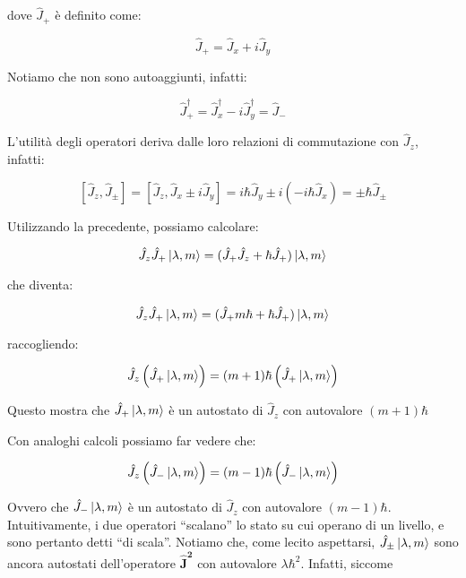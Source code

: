 dove $\hat{J}_+$ \`e definito come:

	\[
		\hat{J}_+ = \hat{J}_x + i \hat{J}_y
	\]

Notiamo che non sono autoaggiunti, infatti:

	\[
		\hat{J}^\dagger_+ = \hat{J}^\dagger_x - i \hat{J}^\dagger_y = \hat{J}_-
	\]

L'utilit\`a degli operatori deriva dalle loro relazioni di commutazione con $\hat{J}_z$, infatti:

	\begin{equation}
		\left [ \hat{J}_z, \hat{J}_\pm \right ] = \left [ \hat{J}_z, \hat{J}_x \pm i \hat{J}_y \right ] = i \hbar \hat{J}_y \pm
			i ( -i \hbar \hat{J}_x ) = \pm \hbar \hat{J}_\pm
	\end{equation}

Utilizzando la precedente, possiamo calcolare:

	\begin{equation}
		\hat{J}_z \hat{J}_+ \ket{ \lambda, m} = ( \hat{J}_+ \hat{J}_z + \hbar \hat{J}_+ ) \ket{\lambda, m}
	\end{equation}

che diventa:

	\begin{equation}
		\hat{J}_z \hat{J}_+ \ket{\lambda, m} = (\hat{J}_+ m \hbar + \hbar \hat{J}_+ ) \ket{\lambda, m}
	\end{equation}

raccogliendo:

	\begin{equation}
		\hat{J}_z \left ( \hat{J}_+ \ket{\lambda, m} \right ) = (m + 1) \hbar \left ( \hat{J}_+ \ket{\lambda, m} \right )
	\end{equation}

Questo mostra che $\hat{J}_+ \ket{\lambda, m}$ \`e un autostato di $\hat{J}_z$ con autovalore $(m+1) \hbar$

Con analoghi calcoli possiamo far vedere che:

	\begin{equation}
		\hat{J}_z \left ( \hat{J}_- \ket{\lambda, m} \right ) = (m - 1) \hbar \left ( \hat{J}_- \ket{\lambda, m} \right )
	\end{equation}

Ovvero che $\hat{J}_- \ket{\lambda, m}$ \`e un autostato di $\hat{J}_z$ con autovalore $(m-1) \hbar$. Intuitivamente, i due operatori ``scalano'' lo stato su cui operano di un livello, e sono pertanto detti ``di scala''.
Notiamo che, come lecito aspettarsi, $\hat{J}_\pm \ket{\lambda, m}$ sono ancora autostati dell'operatore $\mathbf{\hat{J}^2}$ con autovalore $\lambda \hbar^2$. Infatti, siccome

